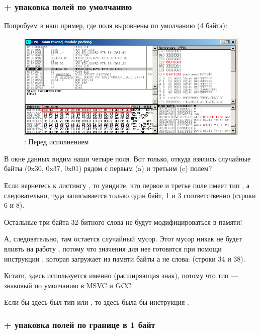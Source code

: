 ﻿\clearpage
\subsubsection{\olly + упаковка полей по умолчанию}
\myindex{\olly}

Попробуем в \olly наш пример, где поля выровнены по умолчанию (4 байта):

\begin{figure}[H]
\centering
\includegraphics[scale=\FigScale]{patterns/15_structs/4_packing/olly_packing_4.png}
\caption{\olly: Перед исполнением \printf}
\label{fig:packing_olly_4}
\end{figure}

В окне данных видим наши четыре поля.
Вот только, откуда взялись случайные байты (0x30, 0x37, 0x01) рядом с первым (a) и третьим (c) полем?

Если вернетесь к листингу , то увидите, что первое и третье поле имеет
тип \Tchar, а следовательно, туда записывается только один байт, 1 и 3 соответственно (строки 6 и 8).

Остальные три байта 32-битного слова не будут модифицироваться в памяти!

А, следовательно, там остается случайный мусор.
Этот мусор никак не будет влиять на работу \printf,
потому что значения для нее готовятся при помощи инструкции \MOVSX, которая загружает
из памяти байты а не слова: 
 (строки 34 и 38).

Кстати, здесь используется именно \MOVSX (расширяющая знак), потому что тип 
\Tchar --- знаковый по умолчанию в MSVC и GCC.

Если бы здесь был тип  или , 
то здесь была бы инструкция \MOVZX.

\clearpage
\subsubsection{\olly + упаковка полей по границе в 1 байт}
\myindex{\olly}

